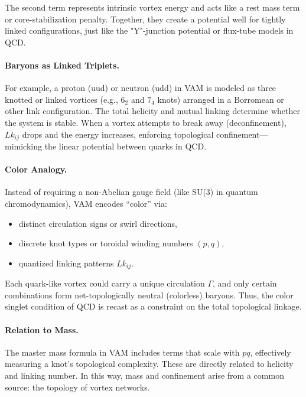 The second term represents intrinsic vortex energy and acts like a rest mass term or core-stabilization penalty. Together, they create a potential well for tightly linked configurations, just like the "Y"-junction potential or flux-tube models in QCD.

\vspace{0.5em}
\paragraph{Baryons as Linked Triplets.} For example, a proton (uud) or neutron (udd) in VAM is modeled as three knotted or linked vortices (e.g., \( 6_2 \) and \( 7_4 \) knots) arranged in a Borromean or other link configuration. The total helicity and mutual linking determine whether the system is stable. When a vortex attempts to break away (deconfinement), \( Lk_{ij} \) drops and the energy increases, enforcing topological confinement—mimicking the linear potential between quarks in QCD.

\vspace{0.5em}
\paragraph{Color Analogy.} Instead of requiring a non-Abelian gauge field (like SU(3) in quantum chromodynamics), VAM encodes “color” via:
\begin{itemize}
    \item distinct circulation signs or swirl directions,
    \item discrete knot types or toroidal winding numbers \( (p, q) \),
    \item quantized linking patterns \( Lk_{ij} \).
\end{itemize}

Each quark-like vortex could carry a unique circulation \( \Gamma \), and only certain combinations form net-topologically neutral (colorless) baryons. Thus, the color singlet condition of QCD is recast as a constraint on the total topological linkage.

\vspace{0.5em}
\paragraph{Relation to Mass.} The master mass formula in VAM includes terms that scale with \( p q \), effectively measuring a knot’s topological complexity. These are directly related to helicity and linking number. In this way, mass and confinement arise from a common source: the topology of vortex networks.

